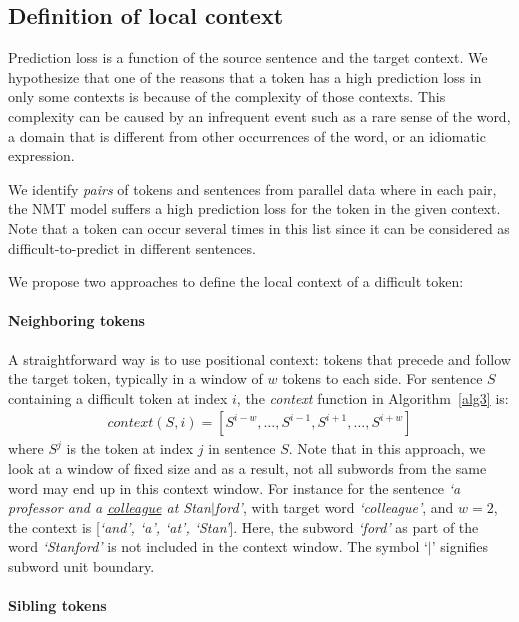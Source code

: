\subsection{Definition of local context}

Prediction loss is a function of the source sentence and the target context.
We hypothesize that one of the reasons that a token has a high prediction loss in only some contexts is because of the complexity of those contexts.
This complexity can be caused by an infrequent event such as a rare sense of the word, a domain that is different from other occurrences of the word, or an idiomatic expression. 

We identify \textit{pairs} of tokens and sentences from parallel data where in each pair, the NMT model suffers a high prediction loss for the token in the given context. 
Note that a token can occur several times in this list since it can be considered as difficult-to-predict in different sentences.

We propose two approaches to define the local context of a difficult token:

\paragraph{Neighboring tokens}

A straightforward way is to use positional context: tokens that precede and follow the target token, typically in a window of $w$ tokens to each side.
For sentence $S$ containing a difficult token at index $i$, the \textit{context} function in Algorithm~\ref{alg3} is:
\begin{align}
context(S, i) = [S^{i-w}, \ldots, S^{i-1}, S^{i+1}, \ldots, S^{i+w}]
\end{align}
\noindent
where $S^{j}$ is the token at index $j$ in sentence $S$.
Note that in this approach, we look at a window of fixed size and as a result, not all subwords from the same word may end up in this context window. For instance for the sentence \textit{`a professor and a \underline{colleague} at Stan$\mid$ford'}, with target word \textit{`colleague'}, and $w=2$, the context is [\textit{`and', `a', `at', `Stan'}]. Here, the subword \textit{`ford'} as part of the word \textit{`Stanford'} is not included in the context window. The symbol `$\mid$' signifies subword unit boundary. 

\paragraph{Sibling tokens}

